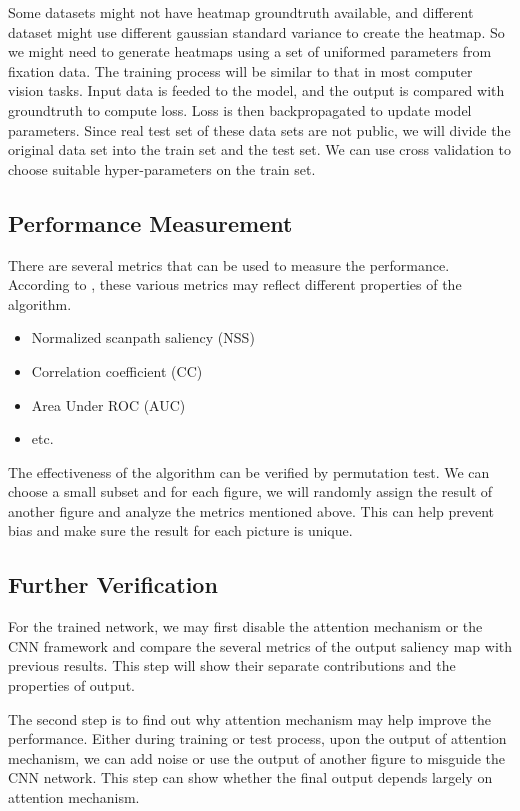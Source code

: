 \documentclass[12pt]{article}
\begin{document}
Some datasets might not have heatmap groundtruth available, and different dataset might use different gaussian standard variance to create the heatmap.
So we might need to generate heatmaps using a set of uniformed parameters from fixation data.
The training process will be similar to that in most computer vision tasks. Input data is feeded to the model,
and the output is compared with groundtruth to compute loss. Loss is then backpropagated to update model parameters.
Since real test set of these data sets are not public, we will divide the original data set into the train set and the test set. We can use cross validation to choose suitable hyper-parameters on the train set.


\subsection{Performance Measurement}

There are several metrics that can be used to measure the performance. According to \cite{riche2013saliency}, these various metrics may reflect different properties of the algorithm.
\begin{itemize}
    \item Normalized scanpath saliency (NSS\cite{petersComponentsBottomupGaze2005})
    \item Correlation coefficient (CC)
    \item Area Under ROC (AUC\cite{richeSaliencyHumanFixations2013})
    \item etc.
\end{itemize}
The effectiveness of the algorithm can be verified by permutation test. We can choose a small subset and for each figure, we will randomly assign the result of another figure and analyze the metrics mentioned above. This can help prevent bias and make sure the result for each picture is unique.

\subsection{Further Verification}

For the trained network, we may first disable the attention mechanism or the CNN framework and compare the several metrics of the output saliency map with previous results. 
This step will show their separate contributions and the properties of output.

The second step is to find out why attention mechanism may help improve the performance. 
Either during training or test process, upon the output of attention mechanism, we can add noise or use the output of another figure to misguide the CNN network. 
This step can show whether the final output depends largely on attention mechanism.
\end{document}
